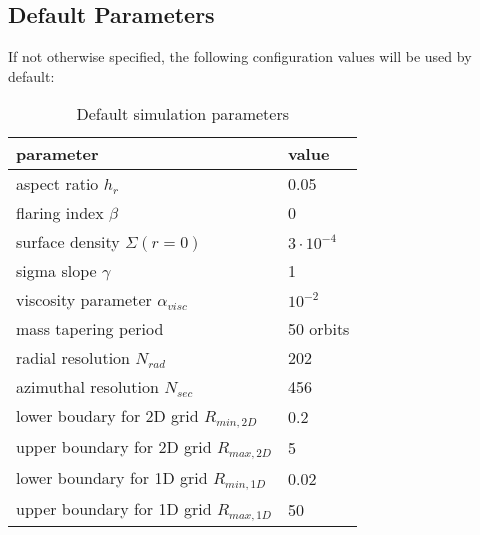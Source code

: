         \subsection{Default Parameters}
          If not otherwise specified, the following configuration values will be 
          used by default:
          \begin{table}[h!]
            \begin{center}
              \caption{Default simulation parameters}
              \renewcommand{\arraystretch}{1.3}
              \begin{tabular}{l | l}
                parameter & value \\
                \hline
                aspect ratio $h_r$ & 0.05 \\
                flaring index $\beta$ & 0 \\ 
                surface density $\Sigma(r=0)$ & $3\cdot10^{-4}$ \\
                sigma slope $\gamma$ & 1 \\
                viscosity parameter $\alpha_{visc}$ & $10^{-2}$ \\
                mass tapering period & 50 orbits \\
                radial resolution $N_{rad}$ & 202 \\
                azimuthal resolution $N_{sec}$ & 456 \\
                lower boudary for 2D grid $R_{min,2D}$ & 0.2 \\
                upper boundary for 2D grid $R_{max,2D}$ & 5 \\
                lower boundary for 1D grid $R_{min,1D}$ & 0.02 \\
                upper boundary for 1D grid $R_{max,1D}$ & 50 \\
              \end{tabular}
            \end{center}
          \end{table} \ \\ 
